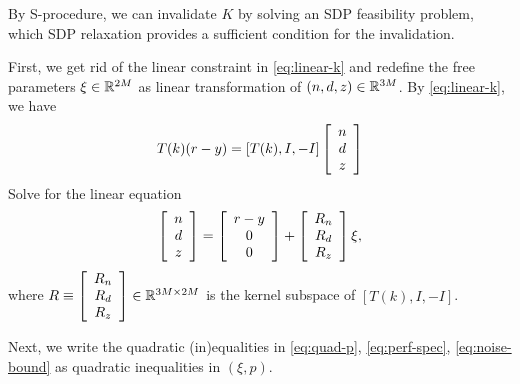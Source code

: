 \documentclass[11pt, onecolumn]{article}
\begin{document}
By S-procedure, we can invalidate $K$ by solving an SDP feasibility problem, which SDP relaxation
provides a sufficient condition for the invalidation.

First, we get rid of the linear constraint in \eqref{eq:linear-k} and redefine the free parameters
$\xi \in\mathbb R^{2M}$ as linear transformation of $(n,d,z) \in\mathbb R^{3M}$.  By \eqref{eq:linear-k}, we have
\begin{align*}
  T(k) (r-y) = [T(k), I, - I]   \left[ \begin{array}[c]{c} n\\d\\z \end{array} \right]
\end{align*}
Solve for the linear equation
\begin{align}
  \label{eq:ndz-xi}
  \left[ \begin{array}[c]{c} n\\d\\z \end{array} \right]
  = \left[ \begin{array}[c]{c} r-y\\0\\0 \end{array} \right]
  +  \left[ \begin{array}[c]{c} R_n\\R_d\\R_z \end{array} \right] \xi,
\end{align}
where $R\equiv \left[ \begin{array}[c]{c} R_n\\R_d\\R_z \end{array} \right] \in\mathbb R^{3M\times 2M}$ is the
kernel subspace of $ [T(k), I, - I] $.

Next, we write the quadratic (in)equalities in \eqref{eq:quad-p}, \eqref{eq:perf-spec},
\eqref{eq:noise-bound} as quadratic inequalities in $(\xi, p)$.
\end{document}
